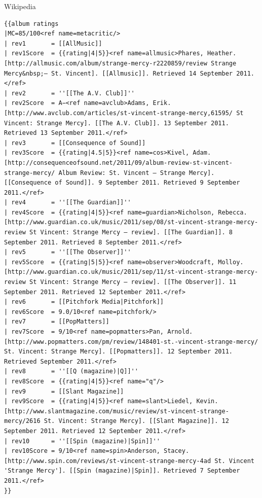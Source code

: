 \documentclass{beamer}
\begin{document}
\begin{frame}[fragile]{Wikipedia}
\begin{verbatim}
{{album ratings
|MC=85/100<ref name=metacritic/>
| rev1       = [[AllMusic]]
| rev1Score  = {{rating|4|5}}<ref name=allmusic>Phares, Heather. [http://allmusic.com/album/strange-mercy-r2220859/review Strange Mercy&nbsp;– St. Vincent]. [[Allmusic]]. Retrieved 14 September 2011.</ref>
| rev2       = ''[[The A.V. Club]]''
| rev2Score  = A−<ref name=avclub>Adams, Erik. [http://www.avclub.com/articles/st-vincent-strange-mercy,61595/ St Vincent: Strange Mercy]. [[The A.V. Club]]. 13 September 2011. Retrieved 13 September 2011.</ref>
| rev3       = [[Consequence of Sound]]
| rev3Score  = {{rating|4.5|5}}<ref name=cos>Kivel, Adam. [http://consequenceofsound.net/2011/09/album-review-st-vincent-strange-mercy/ Album Review: St. Vincent – Strange Mercy]. [[Consequence of Sound]]. 9 September 2011. Retrieved 9 September 2011.</ref>
| rev4       = ''[[The Guardian]]''
| rev4Score  = {{rating|4|5}}<ref name=guardian>Nicholson, Rebecca. [http://www.guardian.co.uk/music/2011/sep/08/st-vincent-strange-mercy-review St Vincent: Strange Mercy – review]. [[The Guardian]]. 8 September 2011. Retrieved 8 September 2011.</ref>
| rev5       = ''[[The Observer]]''
| rev5Score  = {{rating|5|5}}<ref name=observer>Woodcraft, Molloy. [http://www.guardian.co.uk/music/2011/sep/11/st-vincent-strange-mercy-review St Vincent: Strange Mercy – review]. [[The Observer]]. 11 September 2011. Retrieved 12 September 2011.</ref>
| rev6       = [[Pitchfork Media|Pitchfork]]
| rev6Score  = 9.0/10<ref name=pitchfork/>
| rev7       = [[PopMatters]]
| rev7Score  = 9/10<ref name=popmatters>Pan, Arnold. [http://www.popmatters.com/pm/review/148401-st.-vincent-strange-mercy/ St. Vincent: Strange Mercy]. [[Popmatters]]. 12 September 2011. Retrieved September 2011.</ref>
| rev8       = ''[[Q (magazine)|Q]]''
| rev8Score  = {{rating|4|5}}<ref name="q"/>
| rev9       = [[Slant Magazine]]
| rev9Score  = {{rating|4|5}}<ref name=slant>Liedel, Kevin. [http://www.slantmagazine.com/music/review/st-vincent-strange-mercy/2616 St. Vincent: Strange Mercy]. [[Slant Magazine]]. 12 September 2011. Retrieved 12 September 2011.</ref>
| rev10      = ''[[Spin (magazine)|Spin]]''
| rev10Score = 9/10<ref name=spin>Anderson, Stacey. [http://www.spin.com/reviews/st-vincent-strange-mercy-4ad St. Vincent 'Strange Mercy']. [[Spin (magazine)|Spin]]. Retrieved 7 September 2011.</ref>
}}
\end{verbatim}
\end{frame}
\end{document}
